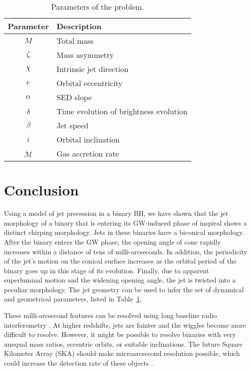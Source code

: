 \documentclass[iop]{emulateapj}
\begin{document}

\begin{table}
\begin{center}
\begin{tabular}{c l}
\hline 
Parameter & Description \\ 
\hline 
$M$ & Total mass \\
$\zeta$ & Mass asymmetry \\
$\chi$ & Intrinsic jet direction \\
$e$ & Orbital eccentricity \\
$\alpha$ & SED slope \\
$\delta$ & Time evolution of brightness evolution \\
$\beta$ & Jet speed \\
$i$ & Orbital inclination \\ 
$\dot{\mathcal M}$ & Gas accretion rate\\
\hline
\end{tabular}
\end{center}
\caption{Parameters of the problem.}
\label{table:params}
\end{table}

\section{Conclusion}

Using a model of jet precession in a binary BH, we have shown that the
jet morphology of a binary that is entering its GW-induced phase of
inspiral shows a distinct chirping morphology. Jets in these binaries
have a biconical morphology.  After the binary enters the GW phase,
the opening angle of cone rapidly increases within a distance of tens
of milli-arcseconds.  In addition, the periodicity of the jet's motion
on the conical surface increases as the orbital period of the binary
goes up in this stage of its evolution.  Finally, due to apparent
superluminal motion and the widening opening angle, the jet is twisted
into a peculiar morphology.  The jet geometry can be used to infer the
set of dynamical and geometrical parameters, listed in
Table~\ref{table:params}.

These milli-arcsecond features can be resolved using long baseline
radio interferometry \citep{2001ChJAA...1..236Q}.  At higher
redshifts, jets are fainter and the wiggles become more difficult to
resolve.  However, it might be possible to resolve binaries with very
unequal mass ratios, eccentric orbits, or suitable inclinations.  The
future Square Kilometer Array (SKA) should make microarcsecond
resolution possible, which could increase the detection rate of these
objects \citep{2014arXiv1412.5971P}.
\end{document}
